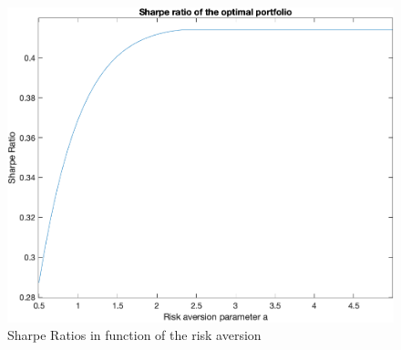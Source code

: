 \documentclass[10pt]{article}
\newenvironment{exercise}[2][Exercise]{\begin{trivlist}
  \item[\hskip \labelsep {\bfseries #1}\hskip \labelsep {\bfseries #2.}]}{\end{trivlist}}
\begin{document}
\begin{exercise}{1}
\begin{itemize}
\begin{figure}[H]
    \includegraphics[scale = 0.8]{Figures/SharpeRatio.png}
    \caption{Sharpe Ratios in function of the risk aversion}
    \label{SR}
  \end{figure}
  
  
  \end{itemize}

\end{exercise}

\newpage
\end{document}
